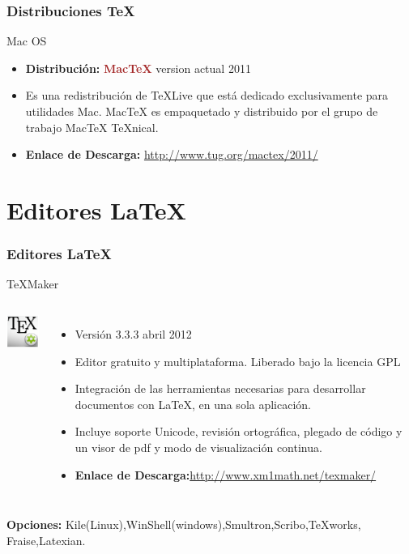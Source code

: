 \documentclass[sans serif,9pt,xcolor=dvipsnames]{beamer}%
\begin{document}
\begin{frame}
\frametitle{Distribuciones \TeX }
\justifying
\begin{block}{Mac OS}
\begin{itemize}
\item \textbf{Distribución: } \textcolor{brown}{\textbf{ MacTeX}} version actual 2011
\item Es una redistribución de TeXLive que está dedicado exclusivamente para utilidades Mac. MacTeX es empaquetado y distribuido por el grupo de trabajo MacTeX TeXnical.
\item \textbf{Enlace de Descarga: }\textcolor{blue}{\url{ http://www.tug.org/mactex/2011/ }}
\end{itemize}
\end{block}
\end{frame}

\section{Editores \LaTeX}
\begin{frame}
\frametitle {Editores \LaTeX}
\justifying


\begin{block}{TeXMaker}
\begin{columns}
 \hspace{0.7cm}
\includegraphics[width=1.8cm]{imagenes/texmaker.png} 
\begin{itemize}
\justifying
\item Versión 3.3.3  abril 2012
\item Editor gratuito y multiplataforma. Liberado bajo la licencia GPL
\item Integración de las herramientas necesarias para desarrollar documentos con LaTeX, en una sola aplicación. 
\item Incluye soporte Unicode, revisión ortográfica, plegado de código y un visor de pdf y modo de visualización continua.
\item \textbf{Enlace de Descarga:}\textcolor{blue}{\url{http://www.xm1math.net/texmaker/}}
\end{itemize}
\end{columns}
\end{block}
\justifying
\textbf{Opciones:} Kile(Linux),WinShell(windows),Smultron,Scribo,TeXworks, Fraise,Latexian.
\end{frame}
\end{document}
